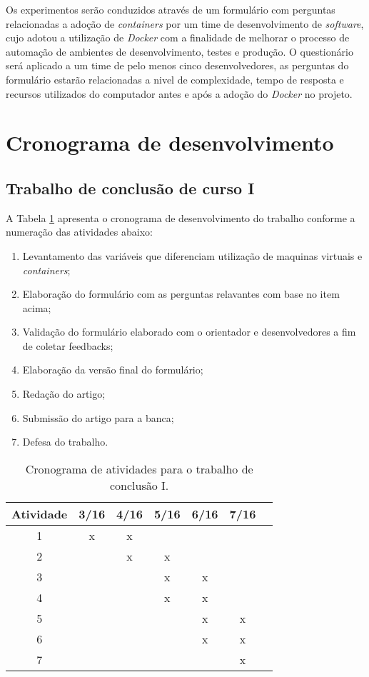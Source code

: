 \documentclass[11pt,a4paper]{article}
\begin{document}
Os experimentos serão conduzidos através de um formulário com perguntas relacionadas a adoção de \textit{containers} por um time
de desenvolvimento de \textit{software}, cujo adotou a utilização de \textit{Docker} com a finalidade de melhorar o processo de automação
de ambientes de desenvolvimento, testes e produção. O questionário será aplicado a um time de pelo menos cinco desenvolvedores,
as perguntas do formulário estarão relacionadas a nivel de complexidade, tempo de resposta e recursos utilizados do computador
antes e após a adoção do \textit{Docker} no projeto.

\section{Cronograma de desenvolvimento}\label{sec:cronograma}

\subsection{Trabalho de conclusão de curso I}

A Tabela \ref{tab:cronograma1} apresenta o cronograma de desenvolvimento do trabalho conforme a numeração das atividades abaixo:
\begin{enumerate}
  \item Levantamento das variáveis que diferenciam utilização de maquinas virtuais e \textit{containers};
  \item Elaboração do formulário com as perguntas relavantes com base no item acima;
  \item Validação do formulário elaborado com o orientador e desenvolvedores a fim de coletar feedbacks;
  \item Elaboração da versão final do formulário;
  \item Redação do artigo;
  \item Submissão do artigo para a banca;
  \item Defesa do trabalho.
\end{enumerate}

\begin{table}[h]
  \begin{center}
    \caption{Cronograma de atividades para o trabalho de conclusão I. \label{tab:cronograma1}}
    \begin{tabular}{|c|c|c|c|c|c|c|}
      \hline
      \bf Atividade & \bf 3/16 & \bf 4/16 & \bf 5/16 & \bf 6/16 & \bf 7/16 \\  \hline \hline
      1 & x & x &   &   &   \\ \hline
      2 &   & x & x &   &   \\ \hline
      3 &   &   & x & x &   \\ \hline
      4 &   &   & x & x &   \\ \hline
      5 &   &   &   & x & x \\ \hline
      6 &   &   &   & x & x \\ \hline
      7 &   &   &   &   & x \\ \hline
    \end{tabular}
  \end{center}
\end{table}
\end{document}
